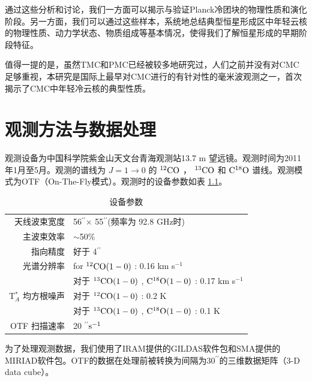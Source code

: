 \documentclass[UTF8, nocolorlinks]{pkuthss}
\newcommand{\coa}{$\rm ^{12}CO$ }
\newcommand{\cob}{$\rm ^{13}CO$ }
\newcommand{\coc}{$\rm C^{18}O$ }
\newcommand{\coaa}{$\rm^{12}CO(1-0)$ }
\newcommand{\cobb}{$\rm^{13}CO(1-0)$ }
\newcommand{\cocc}{$\rm C^{18}O(1-0)$ }
\newcommand{\kms}{km s$^{-1}$}
\newcommand{\arcsec}{$^{\prime\prime}$}
\begin{document}
		通过这些分析和讨论，我们一方面可以揭示与验证Planck冷团块的物理性质和演化阶段。另一方面，我们可以通过这些样本，系统地总结典型恒星形成区中年轻云核的物理性质、动力学状态、物质组成等基本情况，使得我们了解恒星形成的早期阶段特征。

		值得一提的是，虽然TMC和PMC已经被较多地研究过，人们之前并没有对CMC足够重视，本研究是国际上最早对CMC进行的有针对性的毫米波观测之一，首次揭示了CMC中年轻冷云核的典型性质。

\chapter{观测方法与数据处理}
		
		观测设备为中国科学院紫金山天文台青海观测站13.7 m 望远镜。观测时间为2011年1月至5月。观测的谱线为 $J=1 \rightarrow 0 $ 的  \coa， \cob 和 \coc 谱线。观测模式为OTF（On-The-Fly模式）。观测时的设备参数如表 \ref{Fig.Observation}。

		\begin{table}[H]
			\begin{footnotesize}
	        \centering
	        \caption{设备参数\label{Fig.Observation}}
	        \setlength{\tabcolsep}{0.1in}
	        \vspace{0.5em}
	        \begin{tabular}{rl}
	        \toprule
	        \hline
	        天线波束宽度 & 56\arcsec$\times$ 55\arcsec (频率为 92.8 GHz时) \\
	        主波束效率 & $\sim$50\%                               \\
	        指向精度   & 好于 4\arcsec                     \\
	        光谱分辨率  & for \coaa: 0.16 \kms                     \\
	                             & 对于 \cobb, \cocc:  0.17 \kms           \\
	        T$^*_A$ 均方根噪声    & 对于 \coaa: 0.2 K                         \\
	                             & 对于 \cobb, \cocc: 0.1 K               \\
	        OTF 扫描速率          & 20 \arcsec $\rm s^{-1}$\\
	        \hline
	        \bottomrule
	        \end{tabular}
	        \end{footnotesize}
        \end{table}

        为了处理观测数据，我们使用了IRAM提供的GILDAS软件包\supercite{2000ASPC..217..299G}和SMA提供的MIRIAD软件包\supercite{1995ASPC...77..433S}。OTF的数据在处理前被转换为间隔为30\arcsec 的三维数据矩阵（3-D data cube）。
\end{document}

